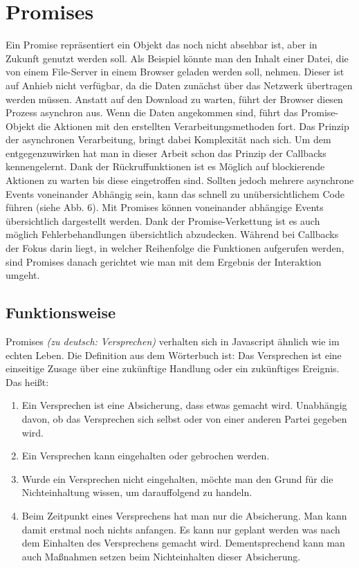 \section{Promises}

Ein Promise repräsentiert ein Objekt das noch nicht absehbar ist, aber in Zukunft genutzt werden soll. Als Beispiel könnte man den Inhalt einer Datei, die von einem File-Server in einem Browser geladen werden soll, nehmen. Dieser ist auf Anhieb nicht verfügbar, da die Daten zunächst über das Netzwerk übertragen werden müssen. Anstatt auf den Download zu warten, führt der Browser diesen Prozess asynchron aus. Wenn die Daten angekommen sind, führt das Promise-Objekt die Aktionen mit den erstellten Verarbeitungsmethoden fort. Das Prinzip der asynchronen Verarbeitung, bringt dabei Komplexität nach sich. Um dem entgegenzuwirken hat man in dieser Arbeit schon das Prinzip der Callbacks kennengelernt. Dank der Rückruffunktionen ist es Möglich auf blockierende Aktionen zu warten bis diese eingetroffen sind. Sollten jedoch mehrere asynchrone Events voneinander Abhängig sein, kann das schnell zu unübersichtlichem Code führen (siehe Abb. 6). Mit Promises können voneinander abhängige Events übersichtlich dargestellt werden. Dank der Promise-Verkettung ist es auch möglich Fehlerbehandlungen übersichtlich abzudecken. Während bei Callbacks der Fokus darin liegt, in welcher Reihenfolge die Funktionen aufgerufen werden, sind Promises danach gerichtet wie man mit dem Ergebnis der Interaktion umgeht.

\subsection{Funktionsweise}

\noindent
Promises \textit{(zu deutsch: Versprechen)} verhalten sich in Javascript ähnlich wie im echten Leben. Die Definition aus dem Wörterbuch ist: Das Versprechen ist eine einseitige Zusage über eine zukünftige Handlung oder ein zukünftiges Ereignis. \cite{versprechen} \\

\noindent
Das heißt:

\begin{enumerate}
    \item Ein Versprechen ist eine Absicherung, dass etwas gemacht wird. Unabhängig davon, ob das Versprechen sich selbst oder von einer anderen Partei gegeben wird.
    
    \item Ein Versprechen kann eingehalten oder gebrochen werden.
    
    \item Wurde ein Versprechen nicht eingehalten, möchte man den Grund für die Nichteinhaltung wissen, um darauffolgend zu handeln.
    
    \item Beim Zeitpunkt eines Versprechens hat man nur die Absicherung. Man kann damit erstmal noch nichts anfangen. Es kann nur geplant werden was nach dem Einhalten des Versprechens gemacht wird. Dementsprechend kann man auch Maßnahmen setzen beim Nichteinhalten dieser Absicherung.
    
\end{enumerate}

